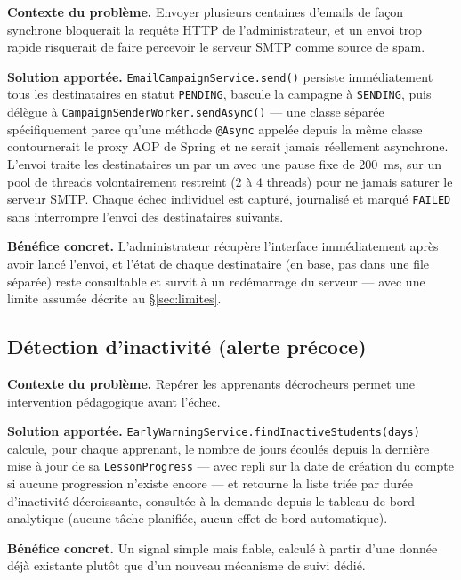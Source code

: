 \textbf{Contexte du problème.} Envoyer plusieurs centaines d'emails de
façon synchrone bloquerait la requête HTTP de l'administrateur, et un
envoi trop rapide risquerait de faire percevoir le serveur SMTP comme
source de spam.

\textbf{Solution apportée.} \texttt{EmailCampaignService.send()} persiste
immédiatement tous les destinataires en statut \texttt{PENDING}, bascule la
campagne à \texttt{SENDING}, puis délègue à
\texttt{CampaignSenderWorker.sendAsync()} --- une classe séparée
spécifiquement parce qu'une méthode \texttt{@Async} appelée depuis la même
classe contournerait le proxy AOP de Spring et ne serait jamais réellement
asynchrone. L'envoi traite les destinataires un par un avec une pause fixe
de 200~ms, sur un pool de threads volontairement restreint (2 à 4 threads)
pour ne jamais saturer le serveur SMTP. Chaque échec individuel est
capturé, journalisé et marqué \texttt{FAILED} sans interrompre l'envoi des
destinataires suivants.

\textbf{Bénéfice concret.} L'administrateur récupère l'interface
immédiatement après avoir lancé l'envoi, et l'état de chaque destinataire
(en base, pas dans une file séparée) reste consultable et survit à un
redémarrage du serveur --- avec une limite assumée décrite au
\S\ref{sec:limites}.

\subsection{Détection d'inactivité (alerte précoce)}
\label{sec:early-warning}

\textbf{Contexte du problème.} Repérer les apprenants décrocheurs
permet une intervention pédagogique avant l'échec.

\textbf{Solution apportée.} \texttt{EarlyWarningService.findInactiveStudents(days)}
calcule, pour chaque apprenant, le nombre de jours écoulés depuis la
dernière mise à jour de sa \texttt{LessonProgress} --- avec repli sur la
date de création du compte si aucune progression n'existe encore --- et
retourne la liste triée par durée d'inactivité décroissante, consultée à
la demande depuis le tableau de bord analytique (aucune tâche planifiée,
aucun effet de bord automatique).

\textbf{Bénéfice concret.} Un signal simple mais fiable, calculé à partir
d'une donnée déjà existante plutôt que d'un nouveau mécanisme de suivi
dédié.

